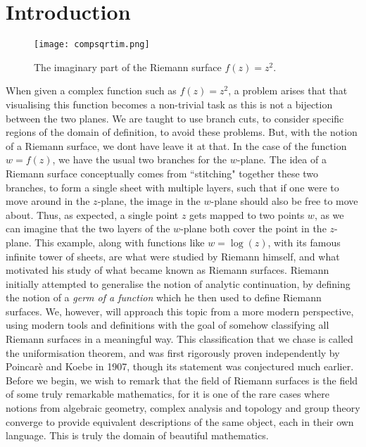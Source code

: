 \documentclass[11pt]{report}
\theoremstyle{definition}
\begin{document}
\chapter*{Introduction}
\begin{wrapfigure}{l}{0.3\textwidth}
  \begin{center}
    \texttt{[image: compsqrtim.png]}
    \caption*{The imaginary part of the Riemann surface $f(z)=z^2$.}
  \end{center}
\end{wrapfigure} When given a complex function such as $f(z)=z^2$, a problem arises that that visualising this function becomes a non-trivial task as this is not a bijection between the two planes. We are taught to use branch cuts, to consider specific regions of the domain of definition, to avoid these problems. But, with the notion of a Riemann surface, we dont have leave it at that. In the case of the function $w = f(z)$, we have the usual two branches for the $w$-plane. The idea of a Riemann surface conceptually comes from ``stitching" together these two branches, to form a single sheet with multiple layers, such that if one were to move around in the $z$-plane, the image in the $w$-plane should also be free to move about. Thus, as expected, a single point $z$ gets mapped to two points $w$, as we can imagine that the two layers of the $w$-plane both cover the point in the $z$-plane. This example, along with functions like $w = \log(z)$, with its famous infinite tower of sheets, are what were studied by Riemann himself, and what motivated his study of what became known as Riemann surfaces. Riemann initially attempted to generalise the notion of analytic continuation, by defining the notion of a \emph{germ of a function} which he then used to define Riemann surfaces. We, however, will approach this topic from a more modern perspective, using modern tools and definitions with the goal of somehow classifying all Riemann surfaces in a meaningful way. This classification that we chase is called the uniformisation theorem, and was first rigorously proven independently by Poincar\`{e} and Koebe in 1907, though its statement was conjectured much earlier. Before we begin, we wish to remark that the field of Riemann surfaces is the field of some truly remarkable mathematics, for it is one of the rare cases where notions from algebraic geometry, complex analysis and topology and group theory converge to provide equivalent descriptions of the same object, each in their own language. This is truly the domain of beautiful mathematics.
\end{document}
